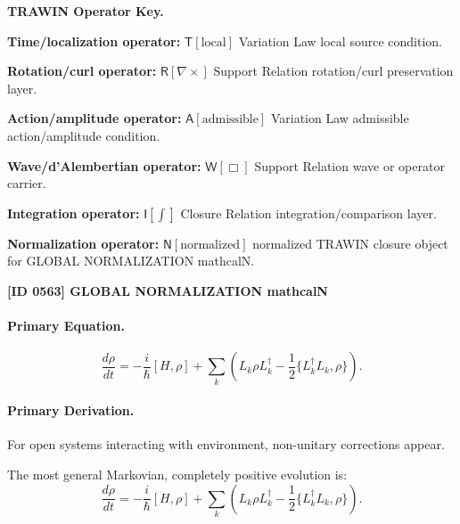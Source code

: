 \par\vspace{0.45\baselineskip}
\noindent\begin{minipage}[t]{\linewidth}
\begingroup
\small
\raggedright
\textbf{TRAWIN Operator Key.}\par
\noindent\textbf{Time/localization operator:} $\mathsf{T}\!\left[\mathrm{local}\right]$ Variation Law local source condition.\par
\noindent\textbf{Rotation/curl operator:} $\mathsf{R}\!\left[\nabla\times\right]$ Support Relation rotation/curl preservation layer.\par
\noindent\textbf{Action/amplitude operator:} $\mathsf{A}\!\left[\mathrm{admissible}\right]$ Variation Law admissible action/amplitude condition.\par
\noindent\textbf{Wave/d'Alembertian operator:} $\mathsf{W}\!\left[\Box\right]$ Support Relation wave or operator carrier.\par
\noindent\textbf{Integration operator:} $\mathsf{I}\!\left[\int\right]$ Closure Relation integration/comparison layer.\par
\noindent\textbf{Normalization operator:} $\mathsf{N}\!\left[\mathrm{normalized}\right]$ normalized TRAWIN closure object for GLOBAL NORMALIZATION mathcalN.\par
\endgroup
\end{minipage}

\clearpage
\noindent\textbf{[ID 0563] GLOBAL NORMALIZATION mathcalN}\par
\vspace{0.35em}
\paragraph{Primary Equation.}
\begin{equation}
\frac{d\rho}{dt}
=
-\frac{i}{\hbar}[H,\rho]
+
\sum_k
\left(
L_k \rho L_k^\dagger
-
\frac{1}{2}
\{L_k^\dagger L_k,\rho\}
\right).
\end{equation}

\paragraph{Primary Derivation.}
For open systems interacting with environment, non-unitary corrections appear.

The most general Markovian, completely positive evolution is:
\begin{equation}
\boxed{
\frac{d\rho}{dt}
=
-\frac{i}{\hbar}[H,\rho]
+
\sum_k
\left(
L_k \rho L_k^\dagger
-
\frac{1}{2}
\{L_k^\dagger L_k,\rho\}
\right).
}
\end{equation}

